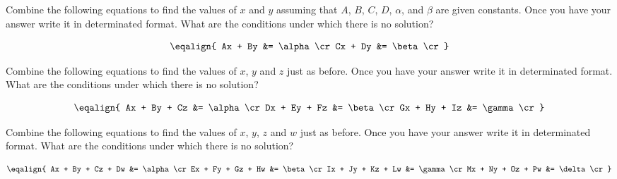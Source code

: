 



Combine the following equations to find the values of $x$ and $y$ assuming
that $A$, $B$, $C$, $D$, $\alpha$, and $\beta$ are given constants. Once you
have your answer write it in determinated format. What are the conditions
under which there is no solution?

$$
\eqalign{
Ax + By &= \alpha \cr
Cx + Dy &= \beta \cr
}
$$


Combine the following equations to find the values of $x$, $y$ and $z$ just as
before. Once you have your answer write it in determinated format. What are
the conditions under which there is no solution?

$$
\eqalign{
Ax + By + Cz &= \alpha \cr
Dx + Ey + Fz &= \beta \cr
Gx + Hy + Iz &= \gamma \cr
}
$$


Combine the following equations to find the values of $x$, $y$, $z$ and $w$
just as before. Once you have your answer write it in determinated format.
What are the conditions under which there is no solution?

$$
\eqalign{
Ax + By + Cz + Dw &= \alpha \cr
Ex + Fy + Gz + Hw &= \beta \cr
Ix + Jy + Kz + Lw &= \gamma \cr
Mx + Ny + Oz + Pw &= \delta \cr
}
$$

\bye
